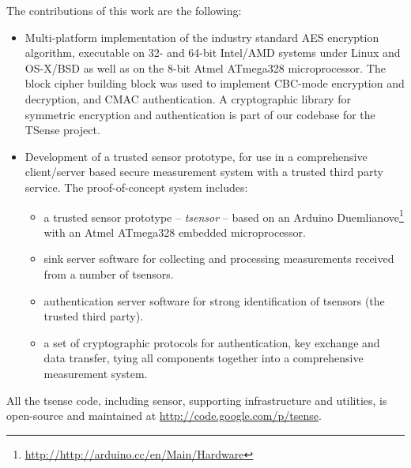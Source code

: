The contributions of this work are the following:
\begin{itemize}
\item Multi-platform implementation of the industry standard AES encryption algorithm, executable on 32- and 64-bit Intel/AMD systems under Linux and OS-X/BSD as well as on the 8-bit Atmel ATmega328 microprocessor. The block cipher building block was used to implement CBC-mode encryption and decryption, and CMAC authentication. A cryptographic library for symmetric encryption and authentication is part of our codebase for the TSense project.
\item Development of a trusted sensor prototype, for use in a comprehensive client/server based secure measurement system with a trusted third party service. The proof-of-concept system includes:
\begin{itemize}
\item a trusted sensor prototype -- \textit{tsensor} -- based on an Arduino Duemlianove\footnote{\url{http://http://arduino.cc/en/Main/Hardware}} with an Atmel ATmega328 embedded microprocessor.
\item sink server software for collecting and processing measurements received from a number of tsensors.
\item authentication server software for strong identification of tsensors (the trusted third party).
\item a set of cryptographic protocols for authentication, key exchange and data transfer, tying all components together into a comprehensive measurement system.
\end{itemize}
\end{itemize}

All the tsense code, including sensor, supporting infrastructure and utilities, is open-source and maintained at \url{http://code.google.com/p/tsense}. 




